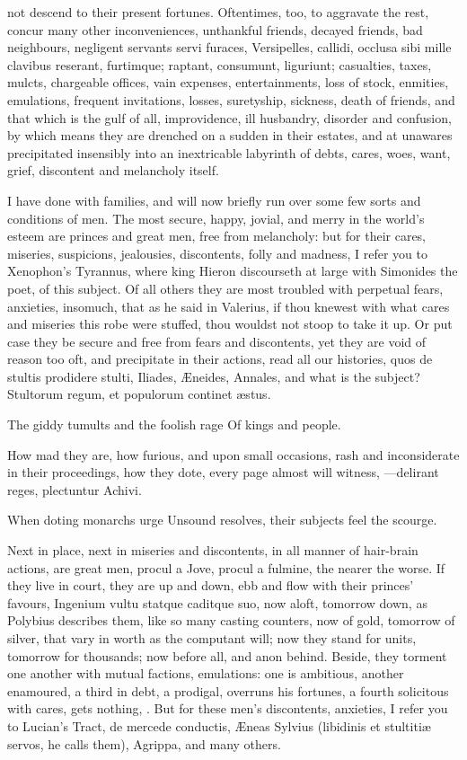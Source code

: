 {not descend to their present fortunes. Oftentimes, too, to aggravate
the rest, concur many other inconveniences, unthankful friends, decayed
friends, bad neighbours, negligent servants servi furaces,
Versipelles, callidi, occlusa sibi mille clavibus reserant, furtimque;
raptant, consumunt, liguriunt; casualties, taxes, mulcts, chargeable
offices, vain expenses, entertainments, loss of stock, enmities,
emulations, frequent invitations, losses, suretyship, sickness, death
of friends, and that which is the gulf of all, improvidence, ill
husbandry, disorder and confusion, by which means they are drenched on
a sudden in their estates, and at unawares precipitated insensibly into
an inextricable labyrinth of debts, cares, woes, want, grief,
discontent and melancholy itself.

I have done with families, and will now briefly run over some few sorts
and conditions of men. The most secure, happy, jovial, and merry in the
world's esteem are princes and great men, free from melancholy: but for
their cares, miseries, suspicions, jealousies, discontents, folly and
madness, I refer you to Xenophon's Tyrannus, where king Hieron
discourseth at large with Simonides the poet, of this subject. Of all
others they are most troubled with perpetual fears, anxieties,
insomuch, that as he said in Valerius, if thou knewest with what
cares and miseries this robe were stuffed, thou wouldst not stoop to
take it up. Or put case they be secure and free from fears and
discontents, yet they are void of reason too oft, and precipitate
in their actions, read all our histories, quos de stultis prodidere
stulti, Iliades, \AE{}neides, Annales, and what is the subject?
Stultorum regum, et populorum continet \ae{}stus.

The giddy tumults and the foolish rage
Of kings and people.

How mad they are, how furious, and upon small occasions, rash and
inconsiderate in their proceedings, how they dote, every page almost
will witness,
---delirant reges, plectuntur Achivi.

When doting monarchs urge
Unsound resolves, their subjects feel the scourge.

Next in place, next in miseries and discontents, in all manner of
hair-brain actions, are great men, procul a Jove, procul a fulmine, the
nearer the worse. If they live in court, they are up and down, ebb and
flow with their princes' favours, Ingenium vultu statque caditque suo,
now aloft, tomorrow down, as Polybius describes them, like so many
casting counters, now of gold, tomorrow of silver, that vary in worth
as the computant will; now they stand for units, tomorrow for
thousands; now before all, and anon behind. Beside, they torment one
another with mutual factions, emulations: one is ambitious, another
enamoured, a third in debt, a prodigal, overruns his fortunes, a fourth
solicitous with cares, gets nothing, \etc{}. But for these men's
discontents, anxieties, I refer you to Lucian's Tract, de mercede
conductis, \AE{}neas Sylvius (libidinis et stultiti\ae{} servos, he
calls them), Agrippa, and many others.

}
